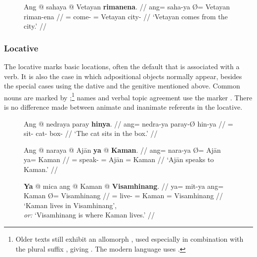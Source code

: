 \begin{figure}[h]
\ex\label{ex:genabl}%
\begingl
	\gla Ang @ sahaya {} @ Vetayan \textbf{rimanena}. //
	\glb ang= saha-ya Ø= Vetayan riman-ena //
	\glc \AgtT{}= come-\TsgM{} \Top{}= Vetayan city-\Gen{} //
	\glft `Vetayan comes from the city.' //
\endgl
\xe
\end{figure}


\subsubsection{Locative}

The locative marks basic locations, often the default that is associated with a
verb. It is also the case in which adpositional objects normally appear,
besides the special cases using the dative and the genitive mentioned above.
Common nouns are marked by ;\footnote{Older texts still exhibit
an allomorph , used especially in combination with the plural
suffix , giving . The modern language uses
.} names and verbal topic agreement use the marker 
. There is no difference made between animate and inanimate 
referents in the locative.

\begin{figure}
\pex\label{ex:locplain}
\a\label{ex:locnedra}\begingl
	\gla Ang @ nedraya paray \textbf{hinya}. //
	\glb ang= nedra-ya paray-Ø hin-ya //
	\glc \AgtT{}= sit-\TsgM{} cat-\Top{} box-\Loc{} //
	\glft `The cat sits in the box.' //
\endgl

\a\label{ex:locnara}\begingl
	\gla Ang @ naraya {} @ Ajān \textbf{ya} @ \textbf{Kaman}. //
	\glb ang= nara-ya Ø= Ajān ya= Kaman //
	\glc \AgtT{}= speak-\TsgM{} \Top{}= Ajān \Loc{}= Kaman //
	\glft `Ajān speaks to Kaman.' //
\endgl

\a\label{ex:locmit}\begingl
	\gla \textbf{Ya} @ mica ang @ Kaman {} @ \textbf{Visamhinang}. //
	\glb ya= mit-ya ang= Kaman Ø= Visamhinang //
	\glc \LocT{}= live-\TsgM{} \Aarg{}= Kaman \Top{}= Visamhinang //
	\glft `Kaman lives in Visamhinang',\\
		\textit{or:} `Visamhinang is where Kaman lives.' //
\endgl
\xe
\end{figure}

